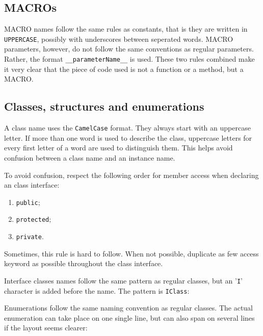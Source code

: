   \newpage


\subsection{MACROs}
MACRO names follow the same rules as constants, that is they are written in 
\texttt{UPPERCASE}, possibly with underscores between seperated words. MACRO 
parameters, however, do not follow the same conventions as regular parameters. 
Rather, the format \texttt{\_\_parameterName\_\_} is used. These two rules 
combined make it very clear that the piece of code used is not a function or a 
method, but a MACRO.


\subsection{Classes, structures and enumerations}

A class name uses the \texttt{CamelCase} format. They always start with an 
uppercase letter. If more than one word is used to describe the class, 
uppercase letters for every first letter of a word are used to distinguish 
them. This helps avoid confusion between a class name and an instance name.

  
To avoid confusion, respect the following order for member access when 
declaring an class interface:
\begin{enumerate}
 \item \texttt{public};
 \item \texttt{protected};
 \item \texttt{private}.
\end{enumerate}
Sometimes, this rule is hard to follow. When not possible, duplicate as 
few access keyword as possible throughout the class interface.

  
Interface classes names follow the same pattern as regular classes, but an 
'\texttt{I}' character is added before the name. The pattern is 
\texttt{IClass}: 

  
Enumerations follow the same naming convention as regular classes. The actual 
enumeration can take place on one single line, but can also span on several 
lines if the layout seems clearer:


